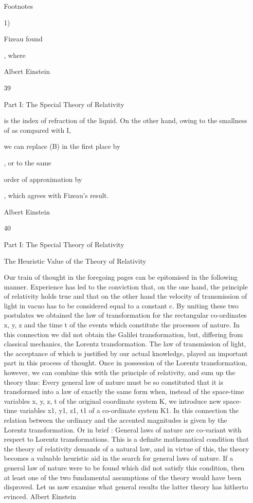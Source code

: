 \documentclass{article}
\begin{document}
Footnotes

1)

Fizeau found

, where

Albert Einstein

39

Part I: The Special Theory of Relativity

is the index of refraction of the liquid. On the other hand, owing to the smallness of
as compared with I,

we can replace (B) in the first place by

, or to the same

order of approximation by

, which agrees with Fizeau's result.

Albert Einstein

40

Part I: The Special Theory of Relativity

The Heuristic Value of the Theory
of Relativity

Our train of thought in the foregoing pages can be epitomised in the following manner.
Experience has led to the conviction that, on the one hand, the principle of relativity holds true
and that on the other hand the velocity of transmission of light in vacuo has to be considered
equal to a constant c. By uniting these two postulates we obtained the law of transformation
for the rectangular co-ordinates x, y, z and the time t of the events which constitute the
processes of nature. In this connection we did not obtain the Galilei transformation, but,
differing from classical mechanics, the Lorentz transformation.
The law of transmission of light, the acceptance of which is justified by our actual
knowledge, played an important part in this process of thought. Once in possession of the
Lorentz transformation, however, we can combine this with the principle of relativity, and
sum up the theory thus:
Every general law of nature must be so constituted that it is transformed into a
law of exactly the same form when, instead of the space-time variables x, y, z, t
of the original coordinate system K, we introduce new space-time variables x1, y1,
z1, t1 of a co-ordinate system K1. In this connection the relation between the
ordinary and the accented magnitudes is given by the Lorentz transformation. Or
in brief : General laws of nature are co-variant with respect to Lorentz
transformations.
This is a definite mathematical condition that the theory of relativity demands of a natural
law, and in virtue of this, the theory becomes a valuable heuristic aid in the search for general
laws of nature. If a general law of nature were to be found which did not satisfy this condition,
then at least one of the two fundamental assumptions of the theory would have been
disproved. Let us now examine what general results the latter theory has hitherto evinced.
Albert Einstein
\end{document}
